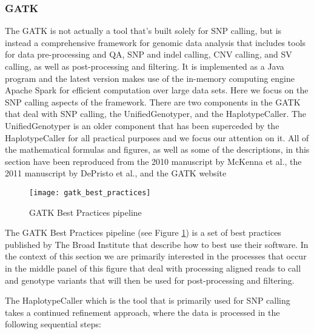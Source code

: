 \subsubsection{GATK}
\label{sec:bg_gatk}
The GATK\autocite{depristo2011framework} is not actually a tool that's built solely for SNP calling, but is instead a comprehensive framework for genomic data analysis that includes tools for data pre-processing and QA, SNP and indel calling, CNV calling, and SV calling, as well as post-processing and filtering. It is implemented as a Java program and the latest version makes use of the in-memory computing engine Apache Spark for efficient computation over large data sets. Here we focus on the SNP calling aspects of the framework. There are two components in the GATK that deal with SNP calling, the UnifiedGenotyper, and the HaplotypeCaller. The UnifiedGenotyper is an older component that has been superceded by the HaplotypeCaller for all practical purposes and we focus our attention on it. All of the mathematical formulas and figures, as well as some of the descriptions, in this section have been reproduced from the 2010 manuscript by McKenna et al.\autocite{mckenna2010genome}, the 2011 manuscript by DePristo et al.\autocite{depristo2011framework}, and the GATK website\autocite{gatkwebsite}

\begin{figure}[!htb]
\texttt{[image: gatk\_best\_practices]}
\centering
\caption {GATK Best Practices pipeline\autocite{gatkwebsite}}
\label{fig:gatk_best_practices}
\end{figure}

The GATK Best Practices pipeline (see Figure \ref{fig:gatk_best_practices}) is a set of best practices published by The Broad Institute that describe how to best use their software. In the context of this section we are primarily interested in the processes that occur in the middle panel of this figure that deal with processing aligned reads to call and genotype variants that will then be used for post-processing and filtering.

The HaplotypeCaller which is the tool that is primarily used for SNP calling takes a continued refinement approach, where the data is processed in the following sequential steps:

